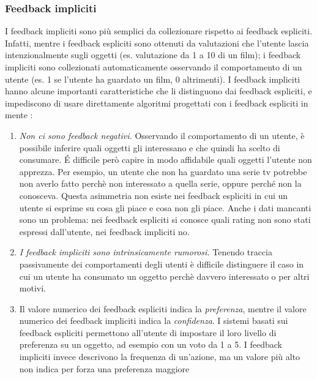 \subsubsection{Feedback impliciti}
I feedback impliciti sono più semplici da collezionare rispetto ai feedback espliciti. Infatti, mentre i feedback espliciti sono ottenuti da valutazioni che l'utente lascia intenzionalmente sugli oggetti (es. valutazione da 1 a 10 di un film); i feedback impliciti sono collezionati automaticamente osservando il comportamento di un utente (es. 1 se l'utente ha guardato un film, 0 altrimenti).
I feedback impliciti hanno alcune importanti caratteristiche che li distinguono dai feedback espliciti, e impediscono di usare direttamente algoritmi progettati con i feedback espliciti in mente \cite{als}:
\begin{enumerate}
 \item \textit{Non ci sono feedback negativi.} Osservando il comportamento di un utente, è possibile inferire quali oggetti gli interessano e che quindi ha scelto di consumare. \'E difficile però capire in modo affidabile quali oggetti l'utente non apprezza. Per esempio, un utente che non ha guardato una serie tv potrebbe non averlo fatto perchè non interessato a quella serie, oppure perché non la conosceva. Questa asimmetria non esiste nei feedback espliciti in cui un utente si esprime su cosa gli piace e cosa non gli piace. Anche i dati mancanti sono un problema: nei feedback espliciti si conosce quali rating non sono stati espressi dall'utente, nei feedback impliciti no.
 
 \item \textit{I feedback impliciti sono intrinsicamente rumorosi.} Tenendo traccia passivamente dei comportamenti degli utenti è difficile distinguere il caso in cui un utente ha consumato un oggetto perchè davvero interessato o per altri motivi.
 
 \item Il valore numerico dei feedback espliciti indica la \textit{preferenza}, mentre il valore numerico dei feedback impliciti indica la \textit{confidenza}. I sistemi basati sui feedback espliciti permettono all'utente di impostare il loro livello di preferenza su un oggetto, ad esempio con un voto da 1 a 5. I feedback impliciti invece descrivono la frequenza di un'azione, ma un valore più alto  non indica per forza una preferenza maggiore
\end{enumerate}

